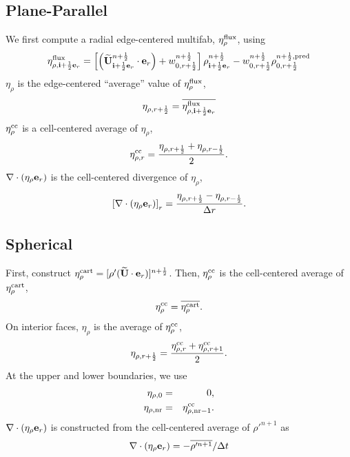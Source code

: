 \documentclass[11pt]{article}
\def\half   {\frac{1}{2}}
\def\eb         {{\bf e}}
\def\ib         {{\bf i}}
\def\Ub         {{\bf U}}
\newcommand{\Ubt}{\widetilde{\Ub}}
\def\etarho     {\eta_\rho}
\def\etarhocc   {\etarho^{\rm cc}}
\def\divetarho  {\nabla\cdot(\etarho\eb_r)}
\begin{document}
\subsection{Plane-Parallel}
We first compute a radial edge-centered multifab, $\eta_{\rho}^{\rm flux}$, using
\begin{equation}
\eta_{\rho,\ib+\half\eb_r}^{\rm flux} = \left[\left(\Ubt_{\ib+\half\eb_r}^{n+\half}\cdot\eb_r\right) + w_{0,r+\half}^{n+\half}\right] \rho_{\ib+\half\eb_r}^{n+\half} - w_{0,r+\half}^{n+\half}\rho_{0,r+\half}^{n+\half, {\rm pred}}
\end{equation}
$\etarho$ is the edge-centered ``average'' value of $\eta_{\rho}^{\rm flux}$,
\begin{equation}
\eta_{\rho,r+\half} = \overline{\eta_{\rho,\ib+\half\eb_r}^{\rm flux}}
\end{equation}
$\etarhocc$ is a cell-centered average of $\etarho$,
\begin{equation}
\eta_{\rho,r}^{\rm cc} = \frac{\eta_{\rho,r+\half} + \eta_{\rho,r-\half}}{2}.
\end{equation}
$\divetarho$ is the cell-centered divergence of $\etarho$,
\begin{equation}
\left[\divetarho\right]_r = \frac{\eta_{\rho,r+\half} - \eta_{\rho,r-\half}}{\Delta r}.
\end{equation}

\subsection{Spherical}
First, construct $\eta_{\rho}^{\rm cart} = [\rho'(\Ubt\cdot\eb_r)]^{n+\half}$.  Then, $\etarhocc$ is the cell-centered average of $\eta_{\rho}^{\rm cart}$,
\begin{equation}
\etarhocc = \overline{\eta_{\rho}^{\rm cart}}.
\end{equation}
On interior faces, $\etarho$ is the average of $\etarhocc$,
\begin{equation}
\eta_{\rho,r+\half} = \frac{\eta_{\rho,r}^{\rm cc} + \eta_{\rho,r+1}^{\rm cc}}{2}.
\end{equation}
At the upper and lower boundaries, we use
\begin{eqnarray}
\eta_{\rho,0} &=& 0, \\
\eta_{\rho,{\rm nr}} &=& \eta_{\rho,{\rm nr}-1}^{\rm cc}.
\end{eqnarray}
$\divetarho$ is constructed from the cell-centered average of $\rho'^{n+1}$ as
\begin{equation}
\divetarho = -\overline{\rho'^{n+1}}/\Delta t
\end{equation}
\end{document}
